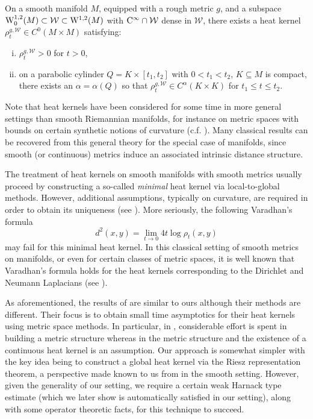 \documentclass[AMS,STIX1COL]{WileyNJD-v2}
\numberwithin{equation}{section}
\renewcommand{\~}{\tilde}
\renewcommand{\-}{\bar}
\newcommand{\8}{\infty}
\newcommand{\cW}{\mathcal{W}}
\newcommand{\intersect}{\cap}
\newcommand{\Ck}[2][{}]{{\rm C}^{#2}_{\rm #1}}		%
\newcommand{\Sob}[2][{}]{{\rm W}^{#2}_{\rm #1}}		%
\newcommand{\SobH}[2][{}]{{\Sob[#1]{#2,2}}}	%
\newcommand{\hk}{\rho}
\begin{document}
\begin{thm}
\label{Thm:Main}
On a smooth manifold \(M\), equipped with a rough metric \(g\), 
and a subspace $\SobH[0]{1}(M) \subset \cW \subset \SobH{1}(M)$
with $\Ck{\infty} \intersect \cW$ dense in $\cW$, 
there exists a heat kernel \(\hk_t^{g,\cW} \in C^{0}(M \times M)\) satisfying:  
\begin{enumerate}[(i)] 
\item \(\hk_t^{g,\cW} > 0\) for \(t > 0\),
\item on a parabolic cylinder \(Q = K \times [t_1, t_2]\) with \(0 < t_1 < t_2\), \(K \subseteq M\) is compact, there exists an \(\alpha = \alpha(Q)\) so that \(\hk_t^{g,\cW} \in C^{\alpha}(K \times K)\) for \(t_1 \leq t \leq t_2\).
\end{enumerate}
\end{thm}


Note that heat kernels have been considered
for some time in more general settings than smooth Riemannian manifolds,
for instance on metric spaces with bounds
on certain synthetic notions of curvature (c.f. \cite{Sturm}).
Many classical results can be recovered from this general 
theory for the special case of manifolds, 
since smooth (or continuous) metrics induce an associated intrinsic
distance structure. 

The treatment of heat kernels on smooth manifolds with smooth metrics 
usually proceed by constructing
a so-called \emph{minimal} heat kernel via local-to-global methods.
However, additional assumptions, typically on curvature,
are required in order to obtain its uniqueness  (see \cite{Chavel}).
More seriously, the following Varadhan's formula
$$ d^2(x,y) = \lim_{t \to 0} 4 t \log \hk_t(x,y)$$
may fail for this minimal heat kernel. 
In this classical setting  of smooth metrics on manifolds, or even for certain classes of  metric spaces,  it is well known that Varadhan's formula holds for the heat  kernels corresponding to the Dirichlet and Neumann Laplacians
(see  \cite{Norris, ERS}).

As aforementioned, the results of \cite{Norris, ERS} 
are similar to ours although their methods are different. 
Their focus is to obtain small time asymptotics for their heat kernels using metric space methods.
In particular, in \cite{Norris}, considerable effort is spent in building a metric structure whereas in \cite{ERS} the metric structure and the existence of a continuous heat kernel is an assumption.
Our approach is somewhat simpler with the key idea being to construct a global heat kernel via the Riesz representation theorem, a perspective made known to us from \cite{Davies} in the smooth setting. 
However, given the generality of our setting, we require a certain weak Harnack type estimate (which we later show is automatically satisfied in our setting),  along with some operator theoretic facts, for this technique to succeed.
\end{document}
